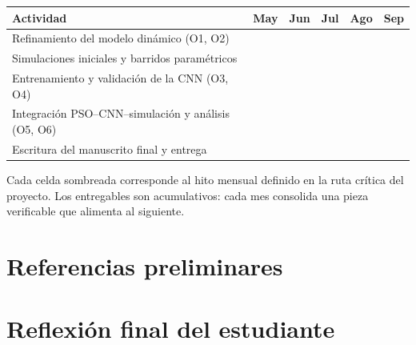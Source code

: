 \documentclass[11pt]{article}
\begin{document}
\begin{table}[H]
\centering
\small
\setlength{\tabcolsep}{4pt}
\renewcommand{\arraystretch}{1.3}
\begin{tabular}{L{5.5cm} C{1.3cm} C{1.3cm} C{1.3cm} C{1.3cm} C{1.3cm}}
\toprule
\textbf{Actividad} & \textbf{May} & \textbf{Jun} & \textbf{Jul} & \textbf{Ago} & \textbf{Sep} \\
\midrule
Refinamiento del modelo dinámico (O1, O2) &  & & & & \\
Simulaciones iniciales y barridos paramétricos & &  & & & \\
Entrenamiento y validación de la CNN (O3, O4) & & &  & & \\
Integración PSO--CNN--simulación y análisis (O5, O6) & & & &  & \\
Escritura del manuscrito final y entrega & & & & &  \\
\bottomrule
\end{tabular}
\end{table}

Cada celda sombreada corresponde al hito mensual definido en la ruta crítica del proyecto. Los entregables son acumulativos: cada mes consolida una pieza verificable que alimenta al siguiente.

\section{Referencias preliminares}

\nocite{Butler2011_PositionControl,Schmidt2012_UltraPrecision,Al-Rawashdeh2022_Caracterization,
Ginsberg1984_AdvancedDynamics,Page2021_PRISMA,Song2021_Review,Heertjes2023_ICM,
Heertjes2020_Control,Wu2015_WM811K,Al-Rawashdeh2023a,Al-Rawashdeh2023b,Heertjes2023_CDC,
Al-Rawashdeh2021,Li2020,Kuang2021,Kuang2020,Al-Rawashdeh2024,Liu2024,Sun2024,Chen2023,Subramanian2024}

\printbibliography[heading=none]

\section{Reflexión final del estudiante}
\end{document}
